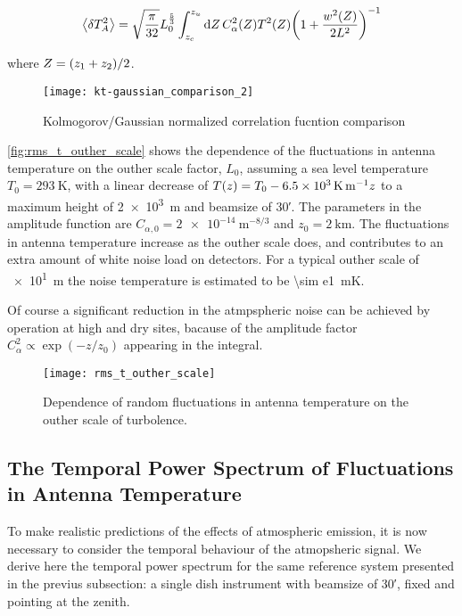 \begin{equation}
        \expval{\var{T^2_A}} = \sqrt{\frac{\pi}{32}} L^\frac{5}{3}_0
        \int^{z_u}_{z_c} \dd{Z} C^2_\alpha\qty(Z) T^2\qty(Z)
        \qty(1 + \frac{w^2\qty(Z)}{2L^2})^{-1}
\end{equation}

where $Z = \qty(z_1 + z_2)/2$.

\begin{figure}
        \centering
        \texttt{[image: kt-gaussian\_comparison\_2]}
        \caption{Kolmogorov/Gaussian normalized correlation fucntion
        comparison}
        \label{fig:kt-gaussian_comparison_2}
\end{figure}

\autoref{fig:rms_t_outher_scale} shows the dependence of the fluctuations
in antenna temperature on the outher scale factor, $L_0$, assuming a sea
level temperature $T_0 = \SI{293}{\kelvin}$, with a linear decrease of $T\qty(z)
= T_0 - \SI{6.5e3}{\kelvin\per\meter}z$ to a maximum height of
\SI{2e3}{\meter} and beamsize of
\ang{;30;}. The parameters in the amplitude function are $C_{\alpha,0}
= \SI{2e-14}{\meter^{-8/3}}$ and $z_0 = \SI{2}{\kilo\meter}$. The fluctuations
in antenna temperature increase as the outher scale does, and
contributes to an extra amount of white noise load on detectors. For a
typical outher scale of \SI{e1}{\meter} the noise temperature is estimated
to be \SI{\sim e1}{\milli\kelvin}.

Of course a significant reduction in the atmpspheric
noise can be achieved by operation
at high and dry sites, bacause of the amplitude factor $C^2_\alpha \propto
\exp(-z/z_0)$ appearing in the integral.

\begin{figure}
        \centering
        \texttt{[image: rms\_t\_outher\_scale]}
        \caption{Dependence of random fluctuations in antenna temperature
        on the outher scale of turbolence.}
        \label{fig:rms_t_outher_scale}
\end{figure}

\subsection{The Temporal Power Spectrum of Fluctuations in Antenna
Temperature}

To make realistic predictions of the effects of atmospheric emission, it is
now necessary to consider the temporal behaviour of the atmopsheric signal.
We derive here the temporal power spectrum for the same reference system
presented in the previus subsection: a single dish instrument with beamsize
of \ang{;30;}, fixed and
pointing at the zenith.

